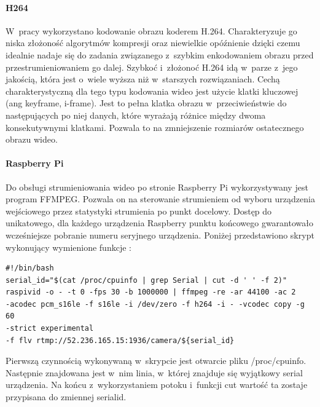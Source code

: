 \paragraph{H264}
W~pracy wykorzystano kodowanie obrazu koderem H.264. Charakteryzuje go niska złożoność algorytmów kompresji oraz niewielkie opóźnienie dzięki czemu idealnie nadaje się do zadania związanego z~szybkim enkodowaniem obrazu przed przestrumieniowaniem go dalej. \cite{H264}
Szybkoć i~złożonoć H.264 idą w~parze z~jego jakością, która jest o~wiele wyższa niż w~starszych rozwiązaniach.
Cechą charakterystyczną dla tego typu kodowania wideo jest użycie klatki kluczowej (ang keyframe, i-frame). Jest to pełna klatka obrazu w~przeciwieństwie do następujących po niej danych, które wyrażają różnice między dwoma konsekutywnymi klatkami. Pozwala to na zmniejszenie rozmiarów ostatecznego obrazu wideo.

\paragraph{Raspberry Pi}
Do obsługi strumieniowania wideo po stronie Raspberry Pi wykorzystywany jest program FFMPEG. Pozwala on na sterowanie strumieniem od wyboru urządzenia wejściowego przez statystyki strumienia po punkt docelowy. Dostęp do unikatowego, dla każdego urządzenia Raspberry punktu końcowego gwarantowało wcześniejsze pobranie numeru seryjnego urządzenia. Poniżej przedstawiono skrypt wykonujący wymienione funkcje \cite{raspivid}:
\begin{verbatim}
#!/bin/bash
serial_id="$(cat /proc/cpuinfo | grep Serial | cut -d ' ' -f 2)"
raspivid -o - -t 0 -fps 30 -b 1000000 | ffmpeg -re -ar 44100 -ac 2 
-acodec pcm_s16le -f s16le -i /dev/zero -f h264 -i - -vcodec copy -g 60 
-strict experimental 
-f flv rtmp://52.236.165.15:1936/camera/${serial_id}
\end{verbatim}
Pierwszą czynnością wykonywaną w~skrypcie jest otwarcie pliku /proc/cpuinfo. Następnie znajdowana jest w~nim linia, w~której znajduje się wyjątkowy serial urządzenia. Na końcu z~wykorzystaniem potoku i~funkcji cut wartość ta zostaje przypisana do zmiennej serialid.


